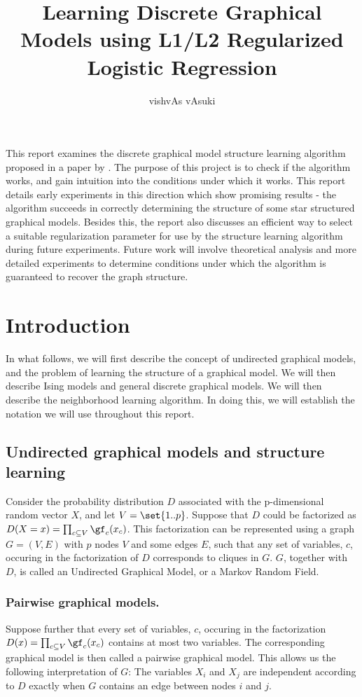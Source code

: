 \documentclass{article}
\title{Learning Discrete Graphical Models using L1/L2 Regularized Logistic Regression}
\author{vishvAs vAsuki}
\date{}
\begin{document}
\maketitle
\abstract
This report examines the discrete graphical model structure learning algorithm proposed in a paper by \citet{ravikumarIsing09}. The purpose of this project is to check if the algorithm works, and gain intuition into the conditions under which it works. This report details early experiments in this direction which show promising results - the algorithm succeeds in correctly determining the structure of some star structured graphical models. Besides this, the report also discusses an efficient way to select a suitable regularization parameter for use by the structure learning algorithm during future experiments. Future work will involve theoretical analysis and more detailed experiments to determine conditions under which the algorithm is guaranteed to recover the graph structure.

\tableofcontents


\section{Introduction}
In what follows, we will first describe the concept of undirected graphical models, and the problem of learning the structure of a graphical model. We will then describe Ising models and general discrete graphical models. We will then describe the neighborhood learning algorithm. In doing this, we will establish the notation we will use throughout this report.

\subsection{Undirected graphical models and structure learning}
Consider the probability distribution $D$ associated with the p-dimensional random vector $X$, and let $V = \set{1 .. p}$. Suppose that $D$ could be factorized as $D(X = x) = \prod_{c\subseteq V} \gf_c(x_c)$. This factorization can be represented using a graph $G = (V, E)$ with $p$ nodes $V$ and some edges $E$, such that any set of variables, $c$, occuring in the factorization of $D$ corresponds to cliques in $G$. $G$, together with $D$, is called an Undirected Graphical Model, or a Markov Random Field.

\subsubsection{Pairwise graphical models.}
Suppose further that every set of variables, $c$, occuring in the factorization $D(x) = \prod_{c\subseteq V} \gf_c(x_c)$ contains at most two variables. The corresponding graphical model is then called a pairwise graphical model. This allows us the following interpretation of $G$: The variables $X_i$ and $X_j$ are independent according to $D$ exactly when $G$ contains an edge between nodes $i$ and $j$.
\end{document}
